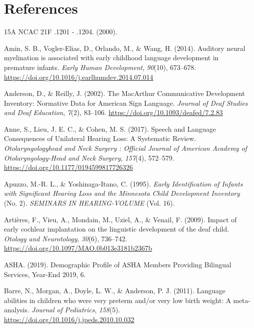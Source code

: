 \documentclass[english,man]{apa6}
\begin{document}
\pagebreak

\hypertarget{references}{%
\section*{References}\label{references}}

\hypertarget{refs}{}
\leavevmode\hypertarget{ref-2000}{}%
15A NCAC 21F .1201 - .1204. (2000).

\leavevmode\hypertarget{ref-amin2014}{}%
Amin, S. B., Vogler-Elias, D., Orlando, M., \& Wang, H. (2014). Auditory neural myelination is associated with early childhood language development in premature infants. \emph{Early Human Development}, \emph{90}(10), 673--678. \url{https://doi.org/10.1016/j.earlhumdev.2014.07.014}

\leavevmode\hypertarget{ref-anderson2002}{}%
Anderson, D., \& Reilly, J. (2002). The MacArthur Communicative Development Inventory: Normative Data for American Sign Language. \emph{Journal of Deaf Studies and Deaf Education}, \emph{7}(2), 83--106. \url{https://doi.org/10.1093/deafed/7.2.83}

\leavevmode\hypertarget{ref-anne2017}{}%
Anne, S., Lieu, J. E. C., \& Cohen, M. S. (2017). Speech and Language Consequences of Unilateral Hearing Loss: A Systematic Review. \emph{Otolaryngologyhead and Neck Surgery : Official Journal of American Academy of Otolaryngology-Head and Neck Surgery}, \emph{157}(4), 572--579. \url{https://doi.org/10.1177/0194599817726326}

\leavevmode\hypertarget{ref-apuzzo1995}{}%
Apuzzo, M.-R. L., \& Yoshinaga-Itano, C. (1995). \emph{Early Identification of Infants with Significant Hearing Loss and the Minnesota Child Development Inventory} (No. 2). \emph{SEMINARS IN HEARING-VOLUME} (Vol. 16).

\leavevmode\hypertarget{ref-artieres2009}{}%
Artières, F., Vieu, A., Mondain, M., Uziel, A., \& Venail, F. (2009). Impact of early cochlear implantation on the linguistic development of the deaf child. \emph{Otology and Neurotology}, \emph{30}(6), 736--742. \url{https://doi.org/10.1097/MAO.0b013e3181b2367b}

\leavevmode\hypertarget{ref-asha2019}{}%
ASHA. (2019). Demographic Profile of ASHA Members Providing Bilingual Services, Year-End 2019, 6.

\leavevmode\hypertarget{ref-barre2011}{}%
Barre, N., Morgan, A., Doyle, L. W., \& Anderson, P. J. (2011). Language abilities in children who were very preterm and/or very low birth weight: A meta-analysis. \emph{Journal of Pediatrics}, \emph{158}(5). \url{https://doi.org/10.1016/j.jpeds.2010.10.032}
\end{document}
